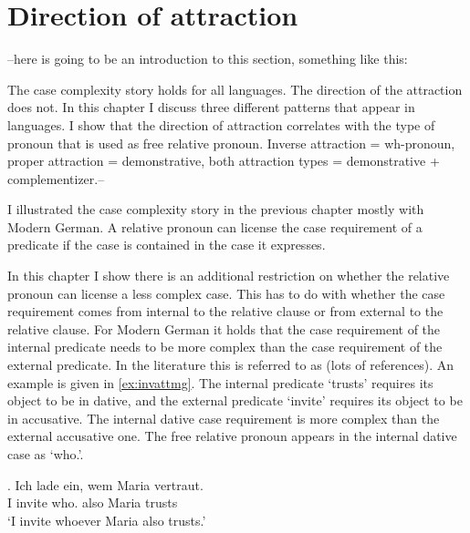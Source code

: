 
\chapter{Direction of attraction}

--here is going to be an introduction to this section, something like this:

The case complexity story holds for all languages. The direction of the attraction does not. In this chapter I discuss three different patterns that appear in languages. I show that the direction of attraction correlates with the type of pronoun that is used as free relative pronoun. Inverse attraction = wh-pronoun, proper attraction = demonstrative, both attraction types = demonstrative + complementizer.--

I illustrated the case complexity story in the previous chapter mostly with Modern German. A relative pronoun can license the case requirement of a predicate if the case is contained in the case it expresses.

In this chapter I show there is an additional restriction on whether the relative pronoun can license a less complex case. This has to do with whether the case requirement comes from internal to the relative clause or from external to the relative clause. For Modern German it holds that the case requirement of the internal predicate needs to be more complex than the case requirement of the external predicate. In the literature this is referred to as  (lots of references). An example is given in \ref{ex:invattmg}. The internal predicate  `trusts' requires its object to be in dative, and the external predicate  `invite' requires its object to be in accusative. The internal dative case requirement is more complex than the external accusative one.
The free relative pronoun appears in the internal dative case as  `who.'.

\exg. Ich {lade ein}, wem Maria vertraut. \\
I invite who. also Maria trusts\\
`I invite whoever Maria also trusts.' \hfill \label{ex:invattmg}

